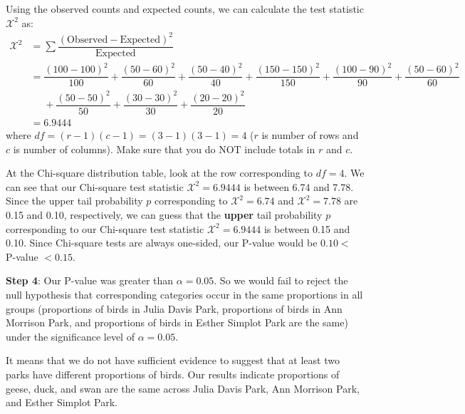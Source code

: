 \documentclass[12pt]{article}
\begin{document}
Using the observed counts and expected counts, we can calculate the test statistic $\mathcal{X}^2$ as:
\begin{align*}
\mathcal{X}^2 &= \sum \dfrac{(\text{Observed} - \text{Expected})^2}{\text{Expected}} \\
&= \dfrac{(100-100)^2}{100} + \dfrac{(50-60)^2}{60} + \dfrac{(50-40)^2}{40} + \dfrac{(150-150)^2}{150} + \dfrac{(100-90)^2}{90} + \dfrac{(50-60)^2}{60} \\
&\phantom{=} + \dfrac{(50-50)^2}{50} + \dfrac{(30-30)^2}{30} + \dfrac{(20-20)^2}{20} \\
&= 6.9444
\end{align*}
where $df = (r-1)(c-1) = (3-1)(3-1) = 4$ ($r$ is number of rows and $c$ is number of columns). Make sure that you do NOT include totals in $r$ and $c$.

At the Chi-square distribution table, look at the row corresponding to $df = 4$. We can see that our Chi-square test statistic $\mathcal{X}^2 = 6.9444$ is between 6.74 and 7.78. Since the upper tail probability $p$ corresponding to $\mathcal{X}^2 = 6.74$ and $\mathcal{X}^2 = 7.78$ are 0.15 and 0.10, respectively, we can guess that the \textbf{upper} tail probability $p$ corresponding to our Chi-square test statistic $\mathcal{X}^2 = 6.9444$ is between 0.15 and 0.10. Since Chi-square tests are always one-sided, our P-value would be $0.10 <$ P-value $< 0.15$.

\noindent \textbf{Step 4}: Our P-value was greater than $\alpha = 0.05$. So we would fail to reject the null hypothesis that corresponding categories occur in the same proportions in all groups (proportions of birds in Julia Davis Park, proportions of birds in Ann Morrison Park, and proportions of birds in Esther Simplot Park are the same) under the significance level of $\alpha = 0.05$.

It means that we do not have sufficient evidence to suggest that at least two parks have different proportions of birds. Our results indicate proportions of geese, duck, and swan are the same across Julia Davis Park, Ann Morrison Park, and Esther Simplot Park.
\end{document}
